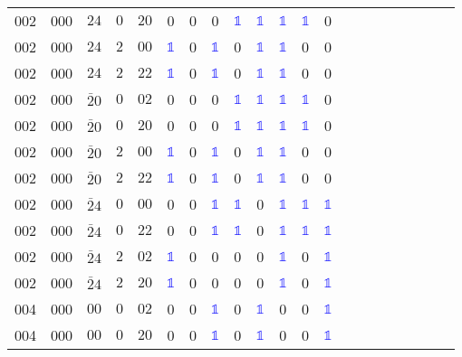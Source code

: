 \begin{longtable*}{c| cccccccccccccccccccc }
002& 000& $24$& $0$& $20$& 0& 0& 0& \textcolor{blue}{$\mathds{1}$}& \textcolor{blue}{$\mathds{1}$}& \textcolor{blue}{$\mathds{1}$}& \textcolor{blue}{$\mathds{1}$}& 0\\
002& 000& $24$& $2$& $00$& \textcolor{blue}{$\mathds{1}$}& 0& \textcolor{blue}{$\mathds{1}$}& 0& \textcolor{blue}{$\mathds{1}$}& \textcolor{blue}{$\mathds{1}$}& 0& 0\\
002& 000& $24$& $2$& $22$& \textcolor{blue}{$\mathds{1}$}& 0& \textcolor{blue}{$\mathds{1}$}& 0& \textcolor{blue}{$\mathds{1}$}& \textcolor{blue}{$\mathds{1}$}& 0& 0\\
002& 000& $\bar{2}0$& $0$& $02$& 0& 0& 0& \textcolor{blue}{$\mathds{1}$}& \textcolor{blue}{$\mathds{1}$}& \textcolor{blue}{$\mathds{1}$}& \textcolor{blue}{$\mathds{1}$}& 0\\
002& 000& $\bar{2}0$& $0$& $20$& 0& 0& 0& \textcolor{blue}{$\mathds{1}$}& \textcolor{blue}{$\mathds{1}$}& \textcolor{blue}{$\mathds{1}$}& \textcolor{blue}{$\mathds{1}$}& 0\\
002& 000& $\bar{2}0$& $2$& $00$& \textcolor{blue}{$\mathds{1}$}& 0& \textcolor{blue}{$\mathds{1}$}& 0& \textcolor{blue}{$\mathds{1}$}& \textcolor{blue}{$\mathds{1}$}& 0& 0\\
002& 000& $\bar{2}0$& $2$& $22$& \textcolor{blue}{$\mathds{1}$}& 0& \textcolor{blue}{$\mathds{1}$}& 0& \textcolor{blue}{$\mathds{1}$}& \textcolor{blue}{$\mathds{1}$}& 0& 0\\
002& 000& $\bar{2}4$& $0$& $00$& 0& 0& \textcolor{blue}{$\mathds{1}$}& \textcolor{blue}{$\mathds{1}$}& 0& \textcolor{blue}{$\mathds{1}$}& \textcolor{blue}{$\mathds{1}$}& \textcolor{blue}{$\mathds{1}$}\\
002& 000& $\bar{2}4$& $0$& $22$& 0& 0& \textcolor{blue}{$\mathds{1}$}& \textcolor{blue}{$\mathds{1}$}& 0& \textcolor{blue}{$\mathds{1}$}& \textcolor{blue}{$\mathds{1}$}& \textcolor{blue}{$\mathds{1}$}\\
002& 000& $\bar{2}4$& $2$& $02$& \textcolor{blue}{$\mathds{1}$}& 0& 0& 0& 0& \textcolor{blue}{$\mathds{1}$}& 0& \textcolor{blue}{$\mathds{1}$}\\
002& 000& $\bar{2}4$& $2$& $20$& \textcolor{blue}{$\mathds{1}$}& 0& 0& 0& 0& \textcolor{blue}{$\mathds{1}$}& 0& \textcolor{blue}{$\mathds{1}$}\\
004& 000& $00$& $0$& $02$& 0& 0& \textcolor{blue}{$\mathds{1}$}& 0& \textcolor{blue}{$\mathds{1}$}& 0& 0& \textcolor{blue}{$\mathds{1}$}\\
004& 000& $00$& $0$& $20$& 0& 0& \textcolor{blue}{$\mathds{1}$}& 0& \textcolor{blue}{$\mathds{1}$}& 0& 0& \textcolor{blue}{$\mathds{1}$}\\

\end{longtable*}
